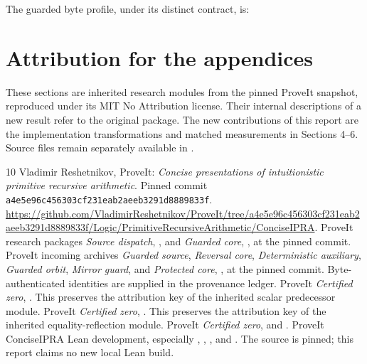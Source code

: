 \documentclass[11pt]{article}
\theoremstyle{definition}\newtheorem{definition}[theorem]{Definition}
\theoremstyle{remark}\newtheorem{remark}[theorem]{Remark}
\newcommand{\srcsha}{\texttt{a4e5e96c456303cf231eab2aeeb3291d8889833f}}
\begin{document}
The guarded byte profile, under its distinct contract, is:


\clearpage
\appendix
\section*{Attribution for the appendices}
These sections are inherited research modules from the pinned
ProveIt snapshot, reproduced under its MIT No Attribution license.
Their internal descriptions of a new result refer to the original
package. The new contributions of this report are the implementation
transformations and matched measurements in Sections 4--6.
Source files remain separately available in .









\begin{thebibliography}{10}
 Vladimir Reshetnikov, ProveIt:
\emph{Concise presentations of intuitionistic primitive recursive arithmetic}.
Pinned commit \srcsha.
\url{https://github.com/VladimirReshetnikov/ProveIt/tree/a4e5e96c456303cf231eab2aeeb3291d8889833f/Logic/PrimitiveRecursiveArithmetic/ConciseIPRA}.
 ProveIt research packages \emph{Source dispatch},
, and \emph{Guarded core},
, at the pinned commit.
 ProveIt incoming archives \emph{Guarded source},
\emph{Reversal core}, \emph{Deterministic auxiliary},
\emph{Guarded orbit}, \emph{Mirror guard}, and \emph{Protected core},
, at the pinned commit.
Byte-authenticated identities are supplied in the provenance ledger.
 ProveIt \emph{Certified zero},
. This preserves the
attribution key of the inherited scalar predecessor module.
 ProveIt \emph{Certified zero},
. This preserves the
attribution key of the inherited equality-reflection module.
 ProveIt \emph{Certified zero},
 and
.
 ProveIt ConciseIPRA Lean development, especially
, ,
, and .
The source is pinned; this report claims no new local Lean build.
\end{thebibliography}
\end{document}
